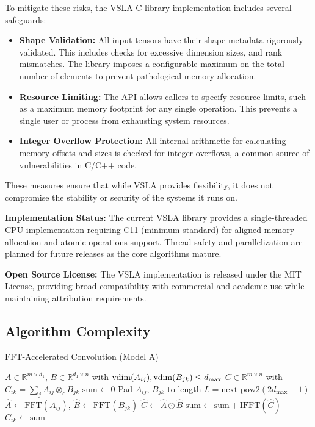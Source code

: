 To mitigate these risks, the VSLA C-library implementation includes several safeguards:
\begin{itemize}
    \item \textbf{Shape Validation:} All input tensors have their shape metadata rigorously validated. This includes checks for excessive dimension sizes, and rank mismatches. The library imposes a configurable maximum on the total number of elements to prevent pathological memory allocation.
    \item \textbf{Resource Limiting:} The API allows callers to specify resource limits, such as a maximum memory footprint for any single operation. This prevents a single user or process from exhausting system resources.
    \item \textbf{Integer Overflow Protection:} All internal arithmetic for calculating memory offsets and sizes is checked for integer overflows, a common source of vulnerabilities in C/C++ code.
\end{itemize}

These measures ensure that while VSLA provides flexibility, it does not compromise the stability or security of the systems it runs on.

\textbf{Implementation Status:} The current VSLA library provides a single-threaded CPU implementation requiring C11 (minimum standard) for aligned memory allocation and atomic operations support. Thread safety and parallelization are planned for future releases as the core algorithms mature.

\textbf{Open Source License:} The VSLA implementation is released under the MIT License, providing broad compatibility with commercial and academic use while maintaining attribution requirements.

\subsection{Algorithm Complexity}

\begin{algorithm}
\caption{FFT-Accelerated Convolution (Model A)}
{\footnotesize
\begin{algorithmic}[1]
\REQUIRE $A \in \mathbb{R}^{m \times d_1}$, $B \in \mathbb{R}^{d_1 \times n}$ with $\operatorname{vdim}(A_{ij}), \operatorname{vdim}(B_{jk}) \leq d_{\max}$
\ENSURE $C \in \mathbb{R}^{m \times n}$ with $C_{ik} = \sum_j A_{ij} \otimes_c B_{jk}$
        \STATE $\text{sum} \leftarrow 0$
            \STATE Pad $A_{ij}$, $B_{jk}$ to length $L = \text{next\_pow2}(2d_{\max} - 1)$
            \STATE $\hat{A} \leftarrow \text{FFT}(A_{ij})$, $\hat{B} \leftarrow \text{FFT}(B_{jk})$ 
            \STATE $\hat{C} \leftarrow \hat{A} \odot \hat{B}$ 
            \STATE $\text{sum} \leftarrow \text{sum} + \text{IFFT}(\hat{C})$
        \ENDFOR
        \STATE $C_{ik} \leftarrow \text{sum}$
    \ENDFOR
\ENDFOR
\end{algorithmic}
}
\end{algorithm}

